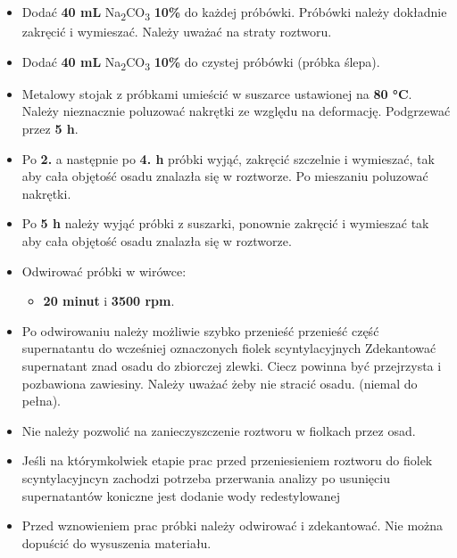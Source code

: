 \documentclass[
  letterpaper,
  DIV=11,
  numbers=noendperiod]{scrreprt}
\providecommand{\tightlist}{%
  \setlength{\itemsep}{0pt}\setlength{\parskip}{0pt}}\usepackage{longtable,booktabs,array}
\begin{document}
\begin{itemize}
\tightlist
\item
  Dodać \textbf{40 mL} Na\textsubscript{2}CO\textsubscript{3}
  \textbf{10\%} do każdej próbówki. Próbówki należy dokładnie zakręcić i
  wymieszać. Należy uważać na straty roztworu.
\item
  Dodać \textbf{40 mL} Na\textsubscript{2}CO\textsubscript{3}
  \textbf{10\%} do czystej próbówki (próbka ślepa).
\item
  Metalowy stojak z próbkami umieścić w suszarce ustawionej na
  \textbf{80 °C}. Należy nieznacznie poluzować nakrętki ze względu na
  deformację. Podgrzewać przez \textbf{5 h}.
\item
  Po \textbf{2.} a następnie po \textbf{4. h} próbki wyjąć, zakręcić
  szczelnie i wymieszać, tak aby cała objętość osadu znalazła się w
  roztworze. Po mieszaniu poluzować nakrętki.
\item
  Po \textbf{5 h} należy wyjąć próbki z suszarki, ponownie zakręcić i
  wymieszać tak aby cała objętość osadu znalazła się w roztworze.
\item
  Odwirować próbki w wirówce:

  \begin{itemize}
  \tightlist
  \item
    \textbf{20 minut} i \textbf{3500 rpm}.
  \end{itemize}
\item
  Po odwirowaniu należy możliwie szybko przenieść przenieść część
  supernatantu do wcześniej oznaczonych fiolek scyntylacyjnych
  Zdekantować supernatant znad osadu do zbiorczej zlewki. Ciecz powinna
  być przejrzysta i pozbawiona zawiesiny. Należy uważać żeby nie stracić
  osadu. (niemal do pełna).
\item
  Nie należy pozwolić na zanieczyszczenie roztworu w fiolkach przez
  osad.
\end{itemize}

\begin{tcolorbox}[enhanced jigsaw, toptitle=1mm, bottomtitle=1mm, opacitybacktitle=0.6, colframe=quarto-callout-important-color-frame, bottomrule=.15mm, title=\textcolor{quarto-callout-important-color}{\faExclamation}\hspace{0.5em}{Przerwy w procedurze}, colbacktitle=quarto-callout-important-color!10!white, left=2mm, breakable, rightrule=.15mm, colback=white, opacityback=0, arc=.35mm, coltitle=black, leftrule=.75mm, toprule=.15mm, titlerule=0mm]

\begin{itemize}
\tightlist
\item
  Jeśli na którymkolwiek etapie prac przed przeniesieniem roztworu do
  fiolek scyntylacyjncyn zachodzi potrzeba przerwania analizy po
  usunięciu supernatantów koniczne jest dodanie wody redestylowanej
\item
  Przed wznowieniem prac próbki należy odwirować i zdekantować. Nie
  można dopuścić do wysuszenia materiału.
\end{itemize}

\end{tcolorbox}
\end{document}
